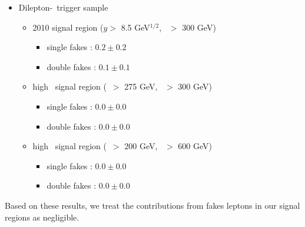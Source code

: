 \begin{itemize}
\item Dilepton-\Ht\ trigger sample
\begin{itemize}
\item 2010 signal region ($y >$ 8.5 GeV$^{1/2}$, \Ht\ $>$ 300 GeV)
   \begin{itemize} 
   \item single fakes : $0.2 \pm 0.2$
   \item double fakes : $0.1 \pm 0.1$
   \end{itemize}  
\item high \met\ signal region (\met\ $>$ 275 GeV, \Ht\ $>$ 300 GeV)
   \begin{itemize} 
   \item single fakes : $0.0 \pm 0.0$
   \item double fakes : $0.0 \pm 0.0$
   \end{itemize}  
\item high \Ht\ signal region (\met\ $>$ 200 GeV, \Ht\ $>$ 600 GeV)
   \begin{itemize} 
   \item single fakes : $0.0 \pm 0.0$
   \item double fakes : $0.0 \pm 0.0$
   \end{itemize}  
\end{itemize}
\end{itemize}

Based on these results, we treat the contributions from fakes leptons in our signal
regions as negligible.
